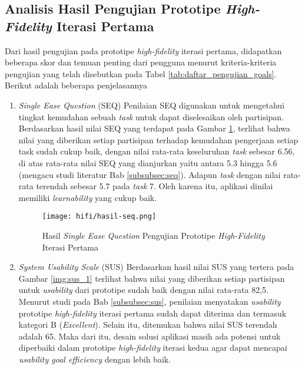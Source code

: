 \newpage

\subsection{Analisis Hasil Pengujian Prototipe \textit{High-Fidelity} Iterasi Pertama}
\label{subsec:test_1_analisis}

Dari hasil pengujian pada prototipe \textit{high-fidelity} iterasi pertama, didapatkan beberapa skor dan temuan penting dari pengguna menurut kriteria-kriteria pengujian yang telah disebutkan pada Tabel \ref{tab:daftar_pengujian_goals}. Berikut adalah beberapa penjelasannya

\begin{enumerate}
  \item \textit{Single Ease Question} (SEQ)
  \subitem  Penilaian SEQ digunakan untuk mengetahui tingkat kemudahan sebuah \textit{task} untuk dapat diselesaikan oleh partisipan. Berdasarkan hasil nilai SEQ yang terdapat pada Gambar \ref{img:seq_1}, terlihat bahwa nilai yang diberikan setiap partisipan terhadap kemudahan pengerjaan setiap task sudah cukup baik, dengan nilai rata-rata keseluruhan \textit{task} sebesar 6.56, di atas rata-rata nilai SEQ yang dianjurkan yaitu antara 5.3 hingga 5.6 (mengacu studi literatur Bab \ref{subsubsec:seq}). Adapun \textit{task} dengan nilai rata-rata terendah sebesar 5.7 pada \textit{task} 7. Oleh karena itu, aplikasi dinilai memiliki \textit{learnability} yang cukup baik. 

  \begin{figure}[h]
    \centering
    \texttt{[image: hifi/hasil-seq.png]}
    \caption{Hasil \textit{Single Ease Question} Pengujian Prototipe \textit{High-Fidelity} Iterasi Pertama}
    \label{img:seq_1}
  \end{figure}
  \FloatBarrier

  \item \textit{System Usability Scale} (SUS)
  \subitem  Berdasarkan hasil nilai SUS yang tertera pada Gambar \ref{img:sus_1} terlihat bahwa nilai yang diberikan setiap partisipan untuk \textit{usability} dari prototipe sudah baik dengan nilai rata-rata 82,5. Menurut studi pada Bab \ref{subsubsec:sus}, penilaian menyatakan \textit{usability} prototipe \textit{high-fidelity} iterasi pertama sudah dapat diterima dan termasuk kategori B (\textit{Excellent}). Selain itu, ditemukan bahwa nilai SUS terendah adalah 65. Maka dari itu, desain solusi aplikasi masih ada potensi untuk diperbaiki dalam prototipe \textit{high-fidelity} iterasi kedua agar dapat mencapai \textit{usability goal efficiency} dengan lebih baik. 


\end{enumerate}

